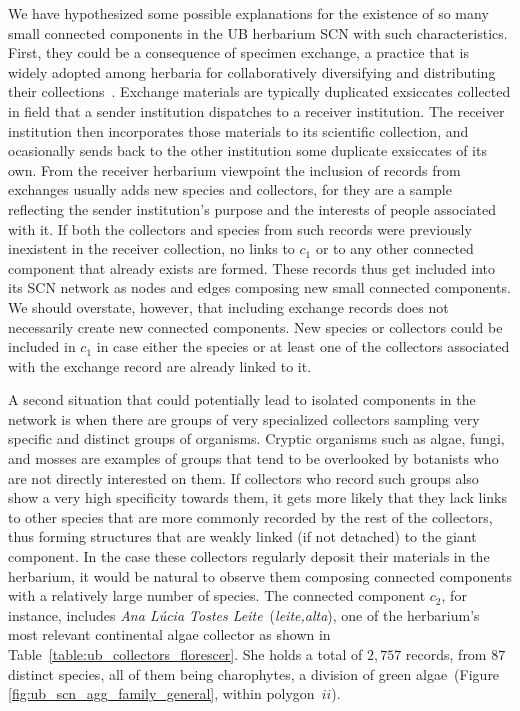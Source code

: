 We have hypothesized some possible explanations for the existence of so many small connected components in the UB herbarium SCN with such characteristics. First, they could be a consequence of specimen exchange, a practice that is widely adopted among herbaria for collaboratively diversifying and distributing their collections~\cite{Groom2014}. Exchange materials are typically duplicated exsiccates collected in field that a sender institution dispatches to a receiver institution. The receiver institution then incorporates those materials to its scientific collection, and ocasionally sends back to the other institution some duplicate exsiccates of its own.
From the receiver herbarium viewpoint the inclusion of records from exchanges usually adds new species and collectors, for they are a sample reflecting the sender institution's purpose and the interests of people associated with it. If both the collectors and species from such records were previously inexistent in the receiver collection, no links to $c_1$ or to any other connected component that already exists are formed. These records thus get included into its SCN network as nodes and edges composing new small connected components. We should overstate, however, that including exchange records does not necessarily create new connected components. New species or collectors could be included in $c_1$ in case either the species or at least one of the collectors associated with the exchange record are already linked to it.

A second situation that could potentially lead to isolated components in the network is when there are groups of very specialized collectors sampling very specific and distinct groups of organisms. 
Cryptic organisms such as algae, fungi, and mosses are examples of groups that tend to be overlooked by botanists who are not directly interested on them. 
If collectors who record such groups also show a very high specificity towards them, it gets more likely that they lack links to other species that are more commonly recorded by the rest of the collectors, thus forming structures that are weakly linked (if not detached) to the giant component. 
In the case these collectors regularly deposit their materials in the herbarium, it would be natural to observe them composing connected components with a relatively large number of species.
The connected component $c_2$, for instance, includes \textit{Ana Lúcia Tostes Leite}~(\textit{leite,alta}), one of the herbarium's most relevant continental algae collector as shown in Table~\ref{table:ub_collectors_florescer}.
She holds a total of $2,757$ records, from $87$ distinct species, all of them being charophytes, a division of green algae~(Figure \ref{fig:ub_scn_agg_family_general}, within polygon~$ii$).

